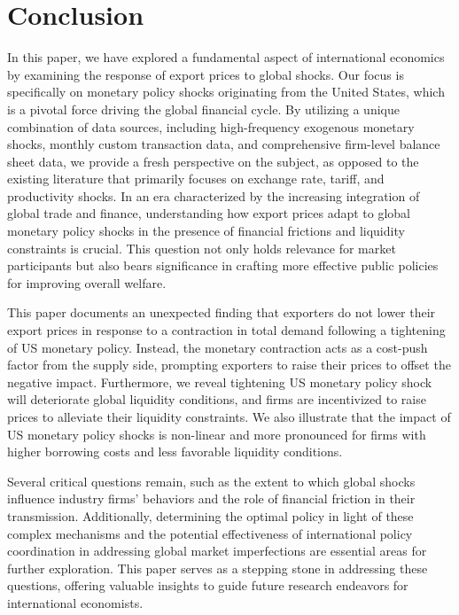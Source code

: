 \section{Conclusion}

In this paper, we have explored a fundamental aspect of international economics by examining the response of export prices to global shocks. Our focus is specifically on monetary policy shocks originating from the United States, which is a pivotal force driving the global financial cycle. By utilizing a unique combination of data sources, including high-frequency exogenous monetary shocks, monthly custom transaction data, and comprehensive firm-level balance sheet data, we provide a fresh perspective on the subject, as opposed to the existing literature that primarily focuses on exchange rate, tariff, and productivity shocks. In an era characterized by the increasing integration of global trade and finance, understanding how export prices adapt to global monetary policy shocks in the presence of financial frictions and liquidity constraints is crucial. This question not only holds relevance for market participants but also bears significance in crafting more effective public policies for improving overall welfare.

This paper documents an unexpected finding that exporters do not lower their export prices in response to a contraction in total demand following a tightening of US monetary policy. Instead, the monetary contraction acts as a cost-push factor from the supply side, prompting exporters to raise their prices to offset the negative impact. Furthermore, we reveal tightening US monetary policy shock will deteriorate global liquidity conditions, and firms are incentivized to raise prices to alleviate their liquidity constraints. We also illustrate that the impact of US monetary policy shocks is non-linear and more pronounced for firms with higher borrowing costs and less favorable liquidity conditions.

Several critical questions remain, such as the extent to which global shocks influence industry firms' behaviors and the role of financial friction in their transmission. Additionally, determining the optimal policy in light of these complex mechanisms and the potential effectiveness of international policy coordination in addressing global market imperfections are essential areas for further exploration. This paper serves as a stepping stone in addressing these questions, offering valuable insights to guide future research endeavors for international economists.




